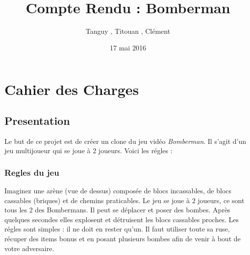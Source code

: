\documentclass[a4paper,11pt,french]{article}
\title{Compte Rendu : Bomberman}
\author{Tanguy \bsc{Thomas}, Titouan \bsc{Rannou}, Clément \bsc{Guin}}
\date{17 mai 2016}
\begin{document}
\maketitle

\section{Cahier des Charges}
\subsection{Presentation}
Le but de ce projet est de créer un clone du jeu vidéo \textit{Bomberman}. Il s'agit d'un jeu multijoueur qui se joue à 2 joueurs. Voici les régles :
\subsubsection{Regles du jeu}
Imaginez une arène (vue de dessus) composée de blocs incassables, de blocs cassables (briques) et de chemins praticables. Le jeu se joue à 2 joueurs, ce sont tous les 2 des Bombermans. Il peut se déplacer et poser des bombes. Après quelques secondes elles explosent et détruisent les blocs cassables proches. Les régles sont simples : il ne doit en rester qu'un. Il faut utiliser toute sa ruse, récuper des items bonus et en posant plusieurs bombes afin de venir à bout de votre adversaire.
\end{document}
